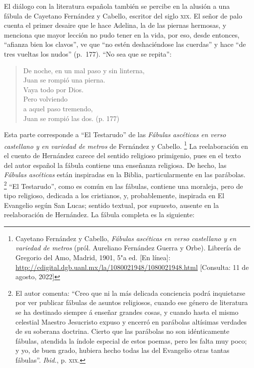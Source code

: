 \documentclass[14pt,twoside,final]{extbook} %
\let\oldfootnote\footnote
\renewcommand\footnote[1]{%
\oldfootnote{\hspace{1mm}#1}}
\begin{document}
El diálogo con la literatura española también se percibe en la alusión a una fábula de Cayetano Fernández y Cabello, escritor del siglo \textsc{xix}. El señor de palo cuenta el primer desaire que le hace Adelina, la de las piernas hermosas, y menciona que mayor lección no pudo tener en la vida, por eso, desde entonces, ``afianza bien los clavos'', ve que ``no estén deshaciéndose las cuerdas'' y hace ``de tres vueltas los nudos'' (p.~177). ``No sea que se repita'':\pagebreak[4]
\begin{verse}
De noche, en un mal paso y sin linterna, \\
Juan se rompió una pierna. \\
Vaya todo por Dios. \\
Pero volviendo \\
a aquel paso tremendo, \\
Juan se rompió las dos. (p. 177)
\end{verse}
Esta parte corresponde a ``El Testarudo'' de las \emph{Fábulas ascéticas en verso castellano y en variedad de metros} de Fernández y Cabello.\footnote{Cayetano Fernández y Cabello, \emph{Fábulas ascéticas en verso castellano y en variedad de metros} (pról. Aureliano Fernández Guerra y Orbe). Librería de Gregorio del Amo, Madrid, 1901, 5"a ed. [En línea]: \url{http://cdigital.dgb.uanl.mx/la/1080021948/1080021948.html} [Consulta: 11 de agosto, 2022]} La reelaboración en el cuento de Hernández carece del sentido religioso primigenio, pues en el texto del autor español la fábula contiene una enseñanza religiosa. De hecho, las \emph{Fábulas ascéticas} están inspiradas en la Biblia, particularmente en las parábolas.\footnote{El autor comenta: ``Creo que ni la más delicada conciencia podrá inquietarse por ver publicar fábulas de asuntos religiosos, cuando ese género de literatura se ha destinado siempre á enseñar grandes cosas, y cuando hasta el mismo celestial Maestro Jesucristo expuso y encerró en parábolas altísimas verdades de su soberana doctrina. Cierto que las parábolas no son idénticamente fábulas, atendida la índole especial de estos poemas, pero les falta muy poco; y yo, de buen grado, hubiera hecho todas las del Evangelio otras tantas fábulas''. \emph{Ibid.}, p. \textsc{xix}.} ``El Testarudo'', como es común en las fábulas, contiene una moraleja, pero de tipo religioso, dedicada a los cristianos, y, probablemente, inspirada en El Evangelio según San Lucas; sentido textual, por supuesto, ausente en la reelaboración de Hernández. La fábula completa es la siguiente:
\end{document}
